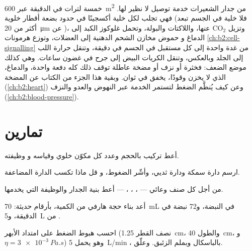 \begin{example}\label{ex:b2:blood-circulation:transport}
خمسة لترات في الدقيقة عبر \qty{600}{m^2} من جدار الشعيرات خدمة
توصيل لا نظير لها. فهي تجلب لكل خلية أكسجينًا في حدود
بضعة أقطار خلوية (فلا خلية في الجسم تبعد أكثر من
\qty{20}{\micro m} عن )، وتزيل $\mathrm{CO_2}$ عنها،
واللاكتات والبولة، وتحمل غلوكوز الكبد إلى الدماغ و
حموض مخازن الشحم الدهنية إلى العضلات، وتوزع
هرمونات \cref{ch:b2:cell-signalling} من غدة واحدة إلى كل
مستقبل في الجسم في دقيقة، وتنقل حرارة اللب إلى
الجلد وبالعكس، وتنقل الكريات البيض إلى جرح في غضون
ساعات. وهي كذلك موضع الضعف: فخثرة أو نزف أو مضخة
عاطلة توقف ذلك كله دفعة واحدة، والدماغ، الذي لا يخزن
وقودًا، يخفق في ثوان. وبقية هذا الجزء من الكتاب
عن المضخة (\cref{ch:b2:heart}) وعن كيف يُنظَّم الضغط
لتستمر الخدمة عبر النهوض والعدو والنزف
(\cref{ch:b2:blood-pressure}).
\end{example}

\section{تمارين}

\begin{exercise}[$\star$]\label{exo:b2:blood-circulation:1}
أعط تركيب  بالحجم وعدد كل مكوّن خلوي وقياسه و
وظيفته.
\end{exercise}

\begin{exercise}[$\star$]\label{exo:b2:blood-circulation:2}
ارسم دارة سمكة ودارة ثديي، وأشّر الضغوط، و
قل ماذا تكسب الدارة المضاعفة.
\end{exercise}

\begin{exercise}[$\star$]\label{exo:b2:blood-circulation:3}
من أجل كل صنف وعائي --- ، ، ،  --- أعط
بنية الجدار والوظيفة التي يخدمها.
\end{exercise}

\begin{exercise}[$\star$]\label{exo:b2:blood-circulation:4}
أعد بناء حجة هارفي من الكمية، بأرقام حديثة:
\qty{70}{mL} في النبضة، و\num{72} نبضة في الدقيقة، و\qty{5}{L} من .
\end{exercise}

\begin{exercise}[$\star\star$]\label{exo:b2:blood-circulation:5}
احسب هبوط الضغط على امتداد الأبهر (نصف القطر \qty{1.25}{cm}،
والطول \qty{40}{cm}، و$\eta = \qty{3e-3}{Pa.s}$) وهو يحمل
\qty{5}{L/min} ، بالباسكال وبملم الزئبق. وعلّق.
\end{exercise}

